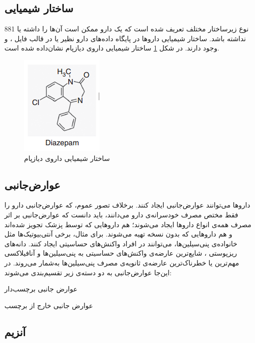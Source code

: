 \subsection{ساختار شیمیایی}

881 نوع زیرساختار مختلف تعریف شده است که یک دارو ممکن است آن‌ها را داشته یا نداشته باشد.  ساختار شیمیایی داروها در پایگاه داده‌های دارو نظیر 
 یا 
\cite{Y. Wang2009}
 در قالب فایل 
،
 و 
 وجود دارند. در شکل
\ref{fs4} 
ساختار شیمیایی داروی دیازپام نشان‌داده شده ‌است.

\begin{figure}
	\centering
	\includegraphics[scale=0.99]{section1/chem.png}
	\caption{	
	 ساختار شیمیایی داروی دیازپام }
	\label{fs4}
\end{figure}

\subsection{عوارض‌جانبی}
\label{sideeffect}

داروها می‌توانند عوارض‌جانبی ایجاد کنند. برخلاف تصور عموم، که عوارض‌جانبی دارو را فقط مختص مصرف خودسرانه‌ی دارو می‌دانند، باید دانست که عوارض‌جانبی بر اثر مصرف همه‌ی انواع داروها ایجاد می‌شوند؛ هم داروهایی که توسط پزشک تجویز شده‌اند و هم داروهایی که بدون نسخه تهیه می‌شوند. برای مثال، برخی آنتی‌بیوتیک‌ها مثل خانواده‌ی پنی‌سیلین‌ها، می‌توانند در افراد واکنش‌های حساسیتی ایجاد کنند. دانه‌های ریزپوستی
،
شایع‌ترین عارضه‌ی واکنش‌های حساسیتی به پنی‌سیلین‌ها و آنافیلاکسی مهم‌ترین یا خطرناک‌ترین عارضه‌ی ثانویه‌ی مصرف پنی‌سیلین‌ها به‌شمار می‌روند.
در این‌جا عوارض‌جانبی به دو دسته‌ی زیر تقسیم‌بندی می‌شوند:

عوارض جانبی برچسب‌دار

عوارض جانبی خارج از برچسب

\subsection{آنزیم‌}

